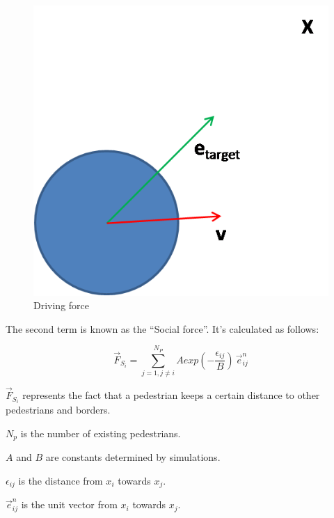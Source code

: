 \documentclass[english]{article}
\begin{document}
    \begin{figure}[h]
        \begin{centering}
        \includegraphics[scale=0.4]{pics/sfm/drivingforce} 
        \par
        \end{centering}
        \caption{\label{fig:driving-force} Driving force}
    \end{figure}
    
    The second term is known as the ``Social force''. It's calculated
    as follows:
    
    \begin{equation}
    \vec{F}_{S_{i}}=\sum_{j=1,j\ne i}^{N_{P}}Aexp(-\frac{\epsilon_{ij}}{B})\,\vec{e}_{ij}^{n}\label{eq:social-force}
    \end{equation}
    
    
    $\vec{F}_{S_{i}}$ represents the fact that a pedestrian keeps a certain
    distance to other pedestrians and borders.
    
    $N_{p}$ is the number of existing pedestrians.
    
    $A$ and $B$ are constants determined by simulations.
    
    $\epsilon_{ij}$ is the distance from $x_{i}$ towards $x_{j}$.
    
    $\vec{e}_{ij}^{n}$ is the unit vector from $x_{i}$ towards $x_{j}$.\\
    
\end{document}

